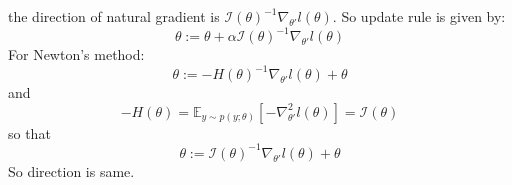 \begin{answer}
the direction of natural gradient is $ \mathcal{I}(\theta)^{-1}\nabla_{\theta'}l(\theta) $.
So update rule is given by:
\[ \theta := \theta + \alpha\mathcal{I}(\theta)^{-1}\nabla_{\theta'}l(\theta) \]
For Newton's method:
\[ \theta := -H(\theta)^{-1}\nabla_{\theta'}l(\theta) + \theta \]
and \[ -H(\theta) = \mathbb{E}_{y\sim p(y;\theta)}[-\nabla^2_{\theta'}l(\theta)] = \mathcal{I}(\theta) \]
so that
\[ \theta := \mathcal{I}(\theta)^{-1}\nabla_{\theta'}l(\theta) + \theta \]
So direction is same.

\end{answer}
